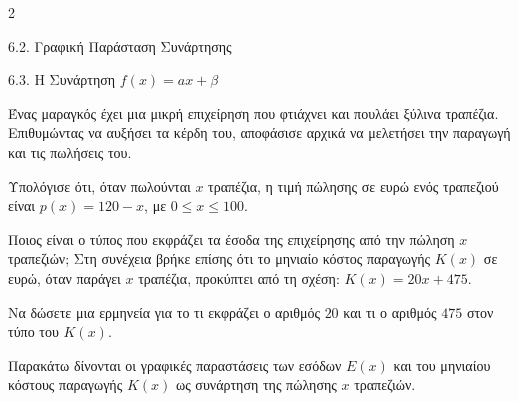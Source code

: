 \begin{ylh}{2}
    \item 6.2. Γραφική Παράσταση Συνάρτησης
    \item 6.3. Η Συνάρτηση $f(x)=ax+\beta$
\end{ylh}

Ένας μαραγκός έχει μια μικρή επιχείρηση που φτιάχνει και πουλάει ξύλινα τραπέζια. Επιθυμώντας να αυξήσει τα κέρδη του, αποφάσισε αρχικά να μελετήσει την παραγωγή και τις πωλήσεις του.

Υπολόγισε ότι, όταν πωλούνται $x$ τραπέζια, η τιμή πώλησης σε ευρώ ενός τραπεζιού είναι $p(x) = 120 - x$, με $0 \leq x \leq 100$.

\begin{alist}
\item Ποιος είναι ο τύπος που εκφράζει τα έσοδα της επιχείρησης από την πώληση $x$ τραπεζιών;
Στη συνέχεια βρήκε επίσης ότι το μηνιαίο κόστος παραγωγής $K(x)$ σε ευρώ, όταν παράγει $x$ τραπέζια, προκύπτει από τη σχέση: $K(x) = 20x + 475$.

\item Να δώσετε μια ερμηνεία για το τι εκφράζει ο αριθμός $20$ και τι ο αριθμός $475$ στον τύπο του $K(x)$.
\item Παρακάτω δίνονται οι γραφικές παραστάσεις των εσόδων $E(x)$ και του μηνιαίου κόστους παραγωγής $K(x)$ ως συνάρτηση της πώλησης $x$ τραπεζιών.

\begin{center}
\end{center}
\end{alist}
